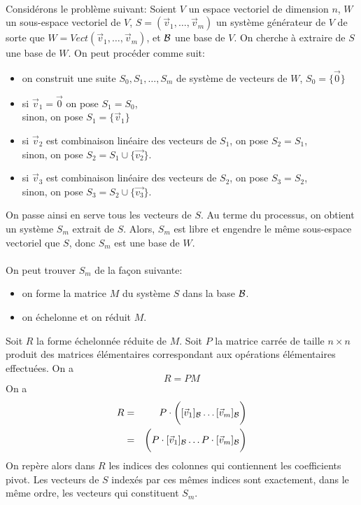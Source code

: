 \paragraph{} Considérons le problème suivant: Soient $V$ un espace vectoriel de dimension $n$, $W$ un sous-espace vectoriel de $V$, $S = (\vec{v}_1, \ldots, \vec{v}_m)$ un système générateur de $V$ de sorte que $W = Vect(\vec{v}_1, \ldots, \vec{v}_m)$, et $\mathcal{B}$ une base de $V$. On cherche à extraire de $S$ une base de $W$. On peut procéder comme suit:
\begin{itemize}
  \item on construit une suite $S_0, S_1, \ldots, S_m$ de système de vecteurs de $W$, $S_0 = \{\vec{0}\}$
  \item si $\vec{v}_1 = \vec{0}$ on pose $S_1 = S_0$, \\
    sinon, on pose $S_1 = \{\vec{v}_1\}$
  \item si $\vec{v}_2$ est combinaison linéaire des vecteurs de $S_1$, on pose $S_2 = S_1$, \\
    sinon, on pose $S_2 = S_1 \cup \{\vec{v_2}\}$.
  \item si $\vec{v}_3$ est combinaison linéaire des vecteurs de $S_2$, on pose $S_3 = S_2$, \\
    sinon, on pose $S_3 = S_2 \cup \{\vec{v_3}\}$.
\end{itemize}
On passe ainsi en serve tous les vecteurs de $S$. Au terme du processus, on obtient un système $S_m$ extrait de $S$. Alors, $S_m$ est libre et engendre le même sous-espace vectoriel que $S$,  donc $S_m$ est une base de $W$. 
\\\\
On peut trouver $S_m$ de la façon suivante:
\begin{itemize}
  \item on forme la matrice $M$ du système $S$ dans la base $\mathcal{B}$.
  \item on échelonne et on réduit $M$.
\end{itemize}
Soit $R$ la forme échelonnée réduite de $M$. Soit $P$ la matrice carrée de taille $n\times n$ produit des matrices élémentaires correspondant aux opérations élémentaires effectuées. On a 
$$R = P M$$
On a 
\begin{eqnarray*}
  R &=& P \cdot \bigg([\vec{v}_1]_{\mathcal{B}} \ldots [\vec{v}_m]_{\mathcal{B}} \bigg) \\
   &=& \bigg(P \cdot [\vec{v}_1]_{\mathcal{B}} \ldots P \cdot [\vec{v}_m]_{\mathcal{B}} \bigg) \\
\end{eqnarray*}
On repère alors dans $R$ les indices des colonnes qui contiennent les coefficients pivot. Les vecteurs de $S$ indexés par ces mêmes indices sont exactement, dans le même ordre, les vecteurs qui constituent $S_m$.

